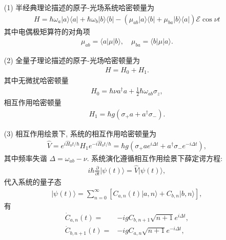 \documentclass{assignment}
\begin{document}
\begin{sol}
    \begin{itemize}
        \item[(1)] 半经典理论描述的原子-光场系统哈密顿量为
        \begin{align}
            H=\hbar\omega_a\lvert a\rangle\langle a\rvert+\hbar\omega_b\lvert b\rangle\langle b\rvert-(\mu_{ab}\lvert a\rangle\langle b\rvert+\mu_{ba}\lvert b\rangle\langle a\rvert)\mathcal{E}\cos\nu t
        \end{align}
        其中电偶极矩算符的对角项
        \begin{align}
            \mu_{ab}=\langle a\rvert\mu\lvert b\rangle,\quad\mu_{ba}=\langle b\rvert\mu\lvert a\rangle.
        \end{align}
        \item[(2)] 全量子理论描述的原子-光场哈密顿量为
        \begin{align}
            H=H_0+H_1.
        \end{align}
        其中无微扰哈密顿量
        \begin{align}
            H_0=\hbar\nu a^{\dagger}a+\frac{1}{2}\hbar\omega_{ab}\sigma_z,
        \end{align}
        相互作用哈密顿量
        \begin{align}
            H_1=\hbar g(\sigma_+a+a^{\dagger}\sigma_-).
        \end{align}
        \item[(3)] 相互作用绘景下, 系统的相互作用哈密顿量为
        \begin{align}
            \hat{V}=e^{i\hat{H}_0t/\hbar}H_1e^{-i\hat{H}_0t/\hbar}=\hbar g(\sigma_+ae^{i\Delta t}+a^{\dagger}\sigma_-e^{-i\Delta t}),
        \end{align}
        其中频率失谐 $\Delta=\omega_{ab}-\nu$.
        系统演化遵循相互作用绘景下薛定谔方程:
        \begin{align}
            i\hbar\frac{\partial}{\partial t}\lvert\psi(t)\rangle=\hat{V}\lvert\psi(t)\rangle,
        \end{align}
        代入系统的量子态
        \begin{align}
            \lvert\psi(t)\rangle=\sum_{n=0}^{\infty}[C_{a,n}(t)\lvert a,n\rangle+C_{b,n}\lvert b,n\rangle],
        \end{align}
        有
        \begin{align}
            \dot{C}_{a,n}(t)=&-igC_{b,n+1}\sqrt{n+1}e^{i\Delta t},\\
            \dot{C}_{b,n+1}(t)=&-igC_{a,n}\sqrt{n+1}e^{-i\Delta t},

\end{align}
\end{itemize}
\end{sol}
\end{document}
